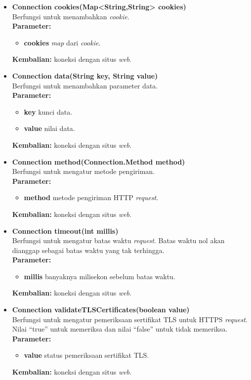 \begin{itemize}
	\item \textbf{Connection cookies(Map<String,String> cookies)} \\
		Berfungsi untuk menambahkan \textit{cookie}. \\
		\textbf{Parameter:}
		\begin{itemize}
			\item \textbf{cookies} \textit{map} dari \textit{cookie}.
		\end{itemize}
		\textbf{Kembalian:} koneksi dengan situs \textit{web}.
		
		\item \textbf{Connection data(String key, String value)} \\
		Berfungsi untuk menambahkan parameter data. \\
		\textbf{Parameter:}
		\begin{itemize}
			\item \textbf{key} kunci data.
			\item \textbf{value} nilai data.
		\end{itemize}
		\textbf{Kembalian:} koneksi dengan situs \textit{web}.
		
		\item \textbf{Connection method(Connection.Method method)} \\
		Berfungsi untuk mengatur metode pengiriman. \\
		\textbf{Parameter:}
		\begin{itemize}
			\item \textbf{method} metode pengiriman HTTP \textit{request}.
		\end{itemize}
		\textbf{Kembalian:} koneksi dengan situs \textit{web}.
		
		\item \textbf{Connection timeout(int millis)} \\
		Berfungsi untuk mengatur batas waktu \textit{request}. Batas waktu nol akan dianggap sebagai batas waktu yang tak terhingga. \\
		\textbf{Parameter:}
		\begin{itemize}
			\item \textbf{millis} banyaknya milisekon sebelum batas waktu.
		\end{itemize}
		\textbf{Kembalian:} koneksi dengan situs \textit{web}.
		
		\item \textbf{Connection validateTLSCertificates(boolean value)} \\
		Berfungsi untuk mengatur pemeriksaan sertifikat TLS untuk HTTPS \textit{request}. Nilai "`true"' untuk memeriksa dan nilai "`false"' untuk tidak memeriksa.\\
		\textbf{Parameter:}
		\begin{itemize}
			\item \textbf{value} status pemeriksaan sertifikat TLS.
		\end{itemize}
		\textbf{Kembalian:} koneksi dengan situs \textit{web}.
		

\end{itemize}

